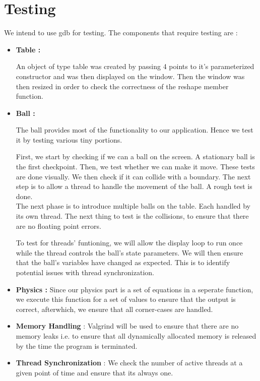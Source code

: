 \documentclass[]{article}
\begin{document}
\section{Testing}

We intend to use gdb for testing. The components that require testing are :

\begin{itemize}



\item \textbf{Table :}

An object of type table was created by passing 4 points to it's parameterized constructor and was then displayed on the window. Then the window was then resized in order to check the correctness of the reshape member function.

\item \textbf{Ball :}

The ball provides most of the functionality to our application. Hence we test it by testing various tiny portions.

First, we start by checking if we can a ball on the screen. A stationary ball is the first checkpoint. Then, we test whether we can make it move. These tests are done visually. We then check if it can collide with a boundary. The next step is to allow a thread to handle the movement of the ball. A rough test is done. \\

The next phase is to introduce multiple balls on the table. Each handled by its own thread. The next thing to test is the collisions, to ensure that there are no floating point errors.

To test for threads' funtioning, we will allow the display loop to run once while the thread controls the ball's state parameters. We will then ensure that the ball's variables have changed as expected. This is to identify potential issues with thread synchronization.

\item \textbf{Physics :} Since our physics part is a set of equations in a seperate function, we execute this function for a set of values to ensure that the output is correct, afterwhich, we ensure that all corner-cases are handled.

\item \textbf{Memory Handling} : Valgrind will be used to ensure that there are no memory leaks i.e. to ensure that all dynamically allocated memory is released by the time the program is terminated.

\item \textbf{Thread Synchronization} : We check the number of active threads at a given point of time and ensure that its always one.


\end{itemize}
\end{document}
